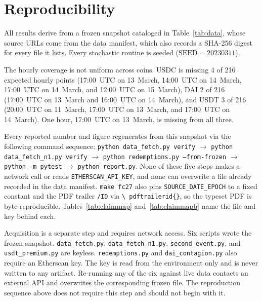 \section{Reproducibility}
\label{app:repro}

All results derive from a frozen snapshot cataloged in Table~\ref{tab:data}, whose source
URLs come from the data manifest, which also records a SHA-256 digest for every file it
lists. Every stochastic routine is seeded
($\mathrm{SEED}=20230311$).

The hourly coverage is not uniform across coins. USDC is missing 4 of 216 expected hourly
points (17:00~UTC on 13~March, 14:00~UTC on 14~March, 17:00~UTC on 14~March, and 12:00~UTC
on 15~March), DAI 2 of 216 (17:00~UTC on 13~March and 16:00~UTC on 14~March), and USDT 3 of
216 (20:00~UTC on 11~March, 17:00~UTC on 13~March, and 17:00~UTC on 14~March). One hour,
17:00~UTC on 13~March, is missing from all three.

\begin{table}[t]
\centering
\caption{Frozen data snapshot. Every row's count is read directly from the file itself.
The 212/213/214-point spread across USDC/DAI/USDT in row 1 reflects independent gaps in the
upstream aggregator's per-coin coverage, enumerated in the text above.}
\label{tab:data}
\small
\checkwidth{\small}

\end{table}

Every reported number and figure regenerates from this snapshot via the following command
sequence: \texttt{python data\_fetch.py verify} $\to$ \texttt{python data\_fetch\_n1.py
verify} $\to$ \texttt{python redemptions.py --from-frozen} $\to$ \texttt{python -m pytest}
$\to$ \texttt{python report.py}. None of these five steps makes a network call or reads
\texttt{ETHERSCAN\_API\_KEY}, and none can overwrite a file already recorded in the data
manifest. \texttt{make fc27} also pins \texttt{SOURCE\_DATE\_EPOCH} to
a fixed constant and the PDF trailer \texttt{/ID} via \texttt{\textbackslash
pdftrailerid\{\}}, so the typeset PDF is byte-reproducible.
Tables~\ref{tab:claimmap} and~\ref{tab:claimmapb} name the file and key behind each.

Acquisition is a separate step and requires network access. Six scripts wrote the frozen
snapshot. \texttt{data\_fetch.py}, \texttt{data\_fetch\_n1.py}, \texttt{second\_event.py},
and \texttt{usdt\_premium.py} are keyless. \texttt{redemptions.py} and
\texttt{dai\_contagion.py} also require an Etherscan key. The key is read from the
environment only and is never written to any artifact. Re-running any of the six against
live data contacts an external API and overwrites the corresponding frozen file. The
reproduction sequence above does not require this step and should not begin with it.


